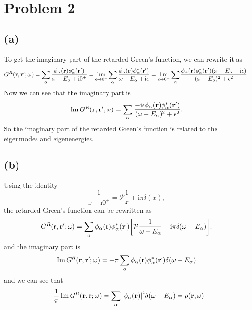 \documentclass{article}
\newcommand{\ii}{\mathrm{i}}
\begin{document}
\section*{Problem 2}
\subsection*{(a)}
To get the imaginary part of the retarded Green's function, we can rewrite it as 
\begin{equation}
    G^{R}(\vb{r},\vb{r}';\omega)=\sum_{\alpha}\frac{\phi_\alpha(\vb{r})\phi^\ast_\alpha(\vb{r}')}{\omega-E_\alpha+\ii 0^+}=\lim_{\epsilon\to 0^+}\sum_{\alpha}\frac{\phi_\alpha(\vb{r})\phi^\ast_\alpha(\vb{r}')}{\omega-E_\alpha+\ii\epsilon}=\lim_{\epsilon\to 0^+}\sum_\alpha \frac{\phi_\alpha(\vb{r})\phi_\alpha^*(\vb{r'})(\omega-E_\alpha-\ii \epsilon)}{(\omega-E_\alpha)^2+\epsilon^2}.
\end{equation}
Now we can see that the imaginary part is
\begin{equation}
    \Im G^{R}(\vb{r},\vb{r}';\omega)=\sum_\alpha \frac{-\ii \epsilon\phi_\alpha(\vb{r})\phi_\alpha^*(\vb{r'})}{(\omega-E_\alpha)^2+\epsilon^2}.
\end{equation}
So the imaginary part of the retarded Green's function is related to the eigenmodes and eigenenergies.

\subsection*{(b)}
Using the identity 
\begin{equation}
    \frac{1}{x\pm \ii 0^+}=\mathcal{P}\frac{1}{x}\mp \ii \pi \delta(x),
\end{equation}
the retarded Green's function can be rewritten as
\begin{equation}
    G^{R}(\vb{r},\vb{r}';\omega)=\sum_{\alpha}\phi_\alpha(\vb{r})\phi_\alpha^*(\vb{r'})\qty[\mathcal{P}\frac{1}{\omega-E_\alpha}-\ii \pi \delta(\omega-E_\alpha)].
\end{equation}
and the imaginary part is
\begin{equation}
    \Im G^{R}(\vb{r},\vb{r}';\omega)=-\pi \sum_{\alpha}\phi_\alpha(\vb{r})\phi_\alpha^*(\vb{r'})\delta(\omega-E_\alpha)
\end{equation}
and we can see that 
\begin{equation}
    -\frac{1}{\pi}\Im G^{R}(\vb{r},\vb{r};\omega)=\sum_{\alpha}\abs{\phi_\alpha(\vb{r})}^2\delta(\omega-E_\alpha)=\rho(\vb{r},\omega)
\end{equation}
\end{document}
